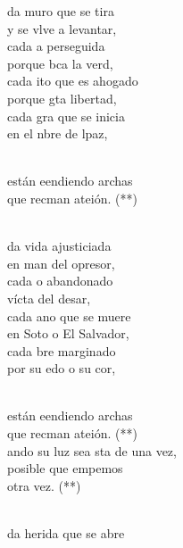 \documentclass[12pt]{article}
\begin{document}
\begin{multicols*}{2}
\begin{cancion}%
	da muro que se tira\\
	y se vlve a levantar,\\
	cada a perseguida \\
	porque bca la verd,\\
	cada ito que es ahogado\\
	porque gta libertad,\\
	cada gra que se inicia\\
	en el nbre de lpaz,\\\jump\\
	\begin{chorus}%
	están eendiendo archas\\
	que recman ateión. (**)\\
	\end{chorus}%
	\jump\\
	da vida ajusticiada\\
	en man del opresor,\\
	cada o abandonado \\
	vícta del desar,\\
	cada ano que se muere\\
	en Soto o El Salvador,\\
	cada bre marginado\\
	por su edo o su cor, \\\jump\\
	\begin{chorus}%
	están eendiendo archas\\
	que recman ateión. (**)\\
	ando su luz sea sta de una vez,\\
	posible que empemos \\
otra vez. (**)\\
	\end{chorus}%
	\jump\\
	da herida que se abre \\

\end{cancion}
\end{multicols*}
\end{document}
